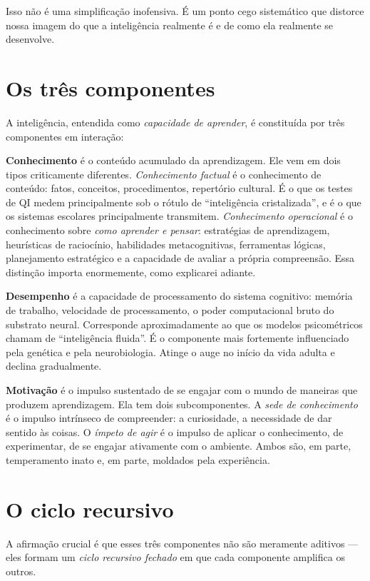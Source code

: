 \documentclass[11pt, twoside, openright]{book}
\begin{document}
Isso não é uma simplificação inofensiva. É um ponto cego sistemático que distorce nossa imagem do que a inteligência realmente é e de como ela realmente se desenvolve.

\section*{Os três componentes}

A inteligência, entendida como \textit{capacidade de aprender}, é constituída por três componentes em interação:

\textbf{Conhecimento} é o conteúdo acumulado da aprendizagem. Ele vem em dois tipos criticamente diferentes. \textit{Conhecimento factual} é o conhecimento de conteúdo: fatos, conceitos, procedimentos, repertório cultural. É o que os testes de QI medem principalmente sob o rótulo de ``inteligência cristalizada'', e é o que os sistemas escolares principalmente transmitem. \textit{Conhecimento operacional} é o conhecimento sobre \textit{como aprender e pensar}: estratégias de aprendizagem, heurísticas de raciocínio, habilidades metacognitivas, ferramentas lógicas, planejamento estratégico e a capacidade de avaliar a própria compreensão. Essa distinção importa enormemente, como explicarei adiante.

\textbf{Desempenho} é a capacidade de processamento do sistema cognitivo: memória de trabalho, velocidade de processamento, o poder computacional bruto do substrato neural. Corresponde aproximadamente ao que os modelos psicométricos chamam de ``inteligência fluida''. É o componente mais fortemente influenciado pela genética e pela neurobiologia. Atinge o auge no início da vida adulta e declina gradualmente.

\textbf{Motivação} é o impulso sustentado de se engajar com o mundo de maneiras que produzem aprendizagem. Ela tem dois subcomponentes. A \textit{sede de conhecimento} é o impulso intrínseco de compreender: a curiosidade, a necessidade de dar sentido às coisas. O \textit{ímpeto de agir} é o impulso de aplicar o conhecimento, de experimentar, de se engajar ativamente com o ambiente. Ambos são, em parte, temperamento inato e, em parte, moldados pela experiência.

\section*{O ciclo recursivo}

A afirmação crucial é que esses três componentes não são meramente aditivos --- eles formam um \textit{ciclo recursivo fechado} em que cada componente amplifica os outros.
\end{document}
